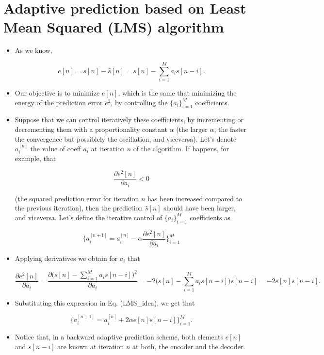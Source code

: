 \section{Adaptive prediction based on Least Mean Squared (LMS) algorithm}
\begin{itemize}
\item
  As we know,

  \begin{equation}
    e[n] = s[n] - \hat{s}[n] = s[n] - \sum_{i=1}^M a_is[n-i].
  \end{equation}
\item
  Our objective is to minimize \(e[n]\), which is the same that
  minimizing the energy of the prediction error \(e^2\), by controlling
  the \(\{a_i\}_{i=1}^M\) coefficients.
\item
  Suppose that we can control iteratively these coefficients, by
  incrementing or decrementing them with a proportionality constant
  \(\alpha\) (the larger \(\alpha\), the faster the convergence but
  possiblely the oscillation, and viceversa). Let's denote \(a_i^{[n]}\)
  the value of coeff \(a_i\) at iteration \(n\) of the algorithm. If
  happens, for example, that

  \begin{equation}
    \frac{\partial e^2[n]}{\partial a_i} < 0
  \end{equation}

  (the squared prediction error for iteration \(n\) has been increased
  compared to the previous iteration), then the prediction
  \(\hat{s}[n]\) should have been larger, and viceversa. Let's define
  the iterative control of \(\{a_i\}_{i=1}^M\) coefficients as

  \begin{equation}
    \Big\{a_i^{[n+1]} = a_i^{[n]} - \alpha\frac{\partial e^2[n]}{\partial a_i}\Big\}_{i=1}^M
    \tag{LMS\_idea}
  \end{equation}

\item
  Applying derivatives we obtain for \(a_i\) that

  \begin{equation}
    \frac{\partial e^2[n]}{\partial a_i} = \frac{\partial\Big(s[n] - \sum_{i=1}^M a_is[n-i]\Big)^2}{\partial a_i} = -2\Big(s[n] - \sum_{i=1}^M a_is[n-i]\Big)s[n-i] = -2e[n]s[n-i].
    \end{equation}
\item
  Substituting this expression in Eq. (LMS\_idea), we get that

  \begin{equation}
    \Big\{a_i^{[n+1]} = a_i^{[n]} +2\alpha e[n]s[n-i]\Big\}_{i=1}^M.
    \tag{LMS\_control}
  \end{equation}
\item
  Notice that, in a backward adaptive prediction scheme, both elements
  \(e[n]\) and \(s[n-i]\) are known at iteration \(n\) at both, the
  encoder and the decoder.
\end{itemize}


